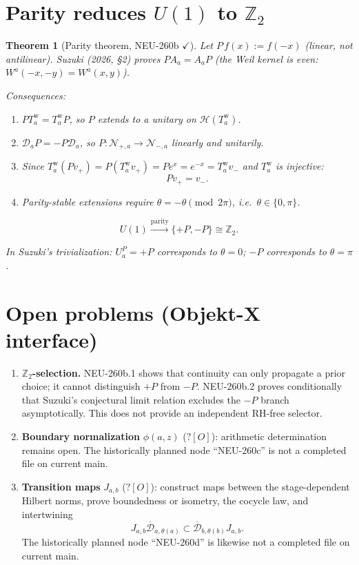 \documentclass[11pt,a4paper]{amsart}
\newtheorem{theorem}{Theorem}[section]
\begin{document}
\section{Parity reduces $U(1)$ to $\mathbb{Z}_2$}

\begin{theorem}[Parity theorem, NEU-260b $\checkmark$]
Let $P\,f(x):=f(-x)$ (linear, not antilinear). Suzuki (2026, \S2)
proves $PA_a=A_aP$ (the Weil kernel is even: $W^a(-x,-y)=W^a(x,y)$).

Consequences:
\begin{enumerate}
\item $PT_a^{\mathrm{w}} = T_a^{\mathrm{w}} P$, so $P$ extends
  to a unitary on $\mathcal{H}(T_a^{\mathrm{w}})$.
\item $\mathscr{D}_a P = -P\mathscr{D}_a$, so
  $P:\mathcal{N}_{+,a}\to\mathcal{N}_{-,a}$ linearly and unitarily.
\item Since $T_a^{\mathrm{w}}(Pv_+)=P(T_a^{\mathrm{w}}v_+)=Pe^x=e^{-x}=T_a^{\mathrm{w}}v_-$
  and $T_a^{\mathrm{w}}$ is injective:
  \[
    Pv_+ = v_-.
  \]
\item Parity-stable extensions require $\theta=-\theta\pmod{2\pi}$, i.e.\
  $\theta\in\{0,\pi\}$.
\end{enumerate}

\[
  \boxed{U(1) \xrightarrow{\mathrm{parity}} \{+P,-P\} \cong \mathbb{Z}_2.}
\]

In Suzuki's trivialization: $U_a^P=+P$ corresponds to $\theta=0$;
$-P$ corresponds to $\theta=\pi$.
\end{theorem}

\section{Open problems (Objekt-X interface)}

\begin{enumerate}
\item \textbf{$\mathbb{Z}_2$-selection.}
  NEU-260b.1 shows that continuity can only propagate a prior choice; it
  cannot distinguish $+P$ from $-P$. NEU-260b.2 proves conditionally that
  Suzuki's conjectural limit relation excludes the $-P$ branch asymptotically.
  This does not provide an independent RH-free selector.
\item \textbf{Boundary normalization} $\phi(a,z)$ ($?[O]$):
  arithmetic determination remains open. The historically planned node
  ``NEU-260c'' is not a completed file on current main.
\item \textbf{Transition maps} $J_{a,b}$ ($?[O]$):
  construct maps between the stage-dependent Hilbert norms, prove boundedness
  or isometry, the cocycle law, and intertwining
  \[
    J_{a,b}\overline{\mathscr{D}}_{a,\theta(a)}\subset
    \overline{\mathscr{D}}_{b,\theta(b)}J_{a,b}.
  \]
  The historically planned node ``NEU-260d'' is likewise not a completed file
  on current main.
\end{enumerate}
\end{document}
